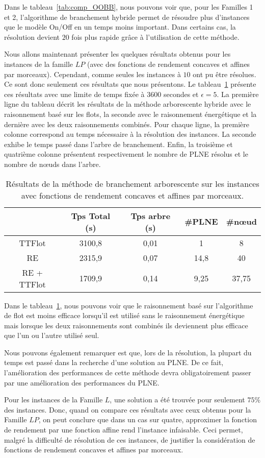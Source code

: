 Dans le tableau~\ref{tab:comp_OOBB}, nous pouvons voir que, pour les
Familles 1 et 2, l'algorithme de branchement hybride permet de
résoudre plus d'instances que le modèle On/Off en un temps moins
important. Dans certains cas, la résolution devient $20$ fois plus
rapide grâce à l'utilisation de cette méthode. 

Nous allons maintenant présenter les quelques résultats obtenus pour
les instances de la famille $LP$ (avec des fonctions de rendement
concaves et affines par morceaux). Cependant, comme seules les
instances à $10$ ont pu être résolues. Ce sont donc seulement ces
résultats que nous présentons. Le tableau~\ref{tab:BB_LPM} présente
ces résultats avec une limite de temps fixée à $3600$ secondes et
$\epsilon=5$. La première ligne du tableau décrit les résultats de la
méthode arborescente hybride avec le raisonnement basé sur les flots,
la seconde avec le raisonnement énergétique et la dernière avec les
deux raisonnements combinés. Pour chaque ligne, la première colonne
correspond au temps nécessaire à la résolution des instances. La
seconde exhibe le temps passé dans l'arbre de branchement. Enfin, la
troisième et quatrième colonne présentent respectivement le nombre de
PLNE résolus et le nombre de n\oe uds dans l'arbre.


\begin{table}[!htb]
\centering 
\begin{tabular}{|c|cccc|}
\hline
 & Tps Total (s)  & Tps arbre (s) & \#PLNE & \#n\oe ud\\
\hline
TTFlot &3100,8 &0,01&	1	& 8\\
RE&2315,9&0,07&	14,8	&40\\
RE + TTFlot &1709,9&	0,14&	9,25	&37,75\\
\hline
\end{tabular}
\caption{Résultats de la méthode de branchement arborescente sur les
  instances avec fonctions de rendement concaves et affines par
  morceaux. }
\label{tab:BB_LPM}
\end{table}

Dans le tableau~\ref{tab:BB_LPM}, nous pouvons voir que le
raisonnement basé sur l'algorithme de flot est moins efficace
lorsqu'il est utilisé sans le raisonnement énergétique mais lorsque
les deux raisonnements sont combinés ils deviennent plus efficace que
l'un ou l'autre utilisé seul. 

Nous pouvons également remarquer est que, lors de la
résolution, la plupart du temps est passé dans la recherche d'une
solution au PLNE. De ce fait, l'amélioration des performances de cette
méthode devra obligatoirement passer par une amélioration des
performances du PLNE. 

Pour les instances de la Famille $L$, une solution a été trouvée pour
seulement $75\%$ des instances. Donc, quand on compare ces résultats
avec ceux obtenus pour la Famille $LP$, on peut conclure que dans un
cas sur quatre, approximer la fonction de rendement par une fonction
affine rend l'instance infaisable. Ceci permet, malgré la difficulté
de résolution de ces instances, de justifier la considération de
fonctions de rendement concaves et affines par morceaux.




